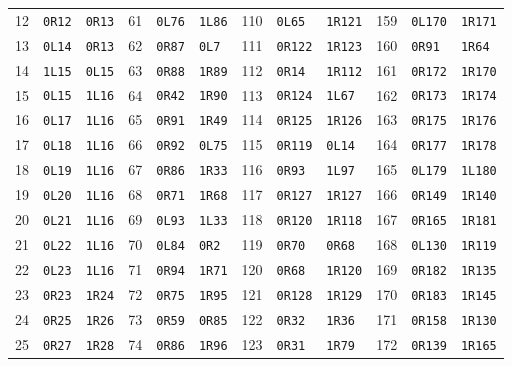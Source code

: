\begin{center}
\begin{tabular}{@{}rll@{\qquad}rll@{\qquad}rll@{\qquad}rll@{}}
12 & \texttt{0R12} & \texttt{0R13} & 61 & \texttt{0L76} & \texttt{1L86} & 110 & \texttt{0L65} & \texttt{1R121} & 159 & \texttt{0L170} & \texttt{1R171}\\
13 & \texttt{0L14} & \texttt{0R13} & 62 & \texttt{0R87} & \texttt{0L7} & 111 & \texttt{0R122} & \texttt{1R123} & 160 & \texttt{0R91} & \texttt{1R64}\\
14 & \texttt{1L15} & \texttt{0L15} & 63 & \texttt{0R88} & \texttt{1R89} & 112 & \texttt{0R14} & \texttt{1R112} & 161 & \texttt{0R172} & \texttt{1R170}\\
15 & \texttt{0L15} & \texttt{1L16} & 64 & \texttt{0R42} & \texttt{1R90} & 113 & \texttt{0R124} & \texttt{1L67} & 162 & \texttt{0R173} & \texttt{1R174}\\
16 & \texttt{0L17} & \texttt{1L16} & 65 & \texttt{0R91} & \texttt{1R49} & 114 & \texttt{0R125} & \texttt{1R126} & 163 & \texttt{0R175} & \texttt{1R176}\\
17 & \texttt{0L18} & \texttt{1L16} & 66 & \texttt{0R92} & \texttt{0L75} & 115 & \texttt{0R119} & \texttt{0L14} & 164 & \texttt{0R177} & \texttt{1R178}\\
18 & \texttt{0L19} & \texttt{1L16} & 67 & \texttt{0R86} & \texttt{1R33} & 116 & \texttt{0R93} & \texttt{1L97} & 165 & \texttt{0L179} & \texttt{1L180}\\
19 & \texttt{0L20} & \texttt{1L16} & 68 & \texttt{0R71} & \texttt{1R68} & 117 & \texttt{0R127} & \texttt{1R127} & 166 & \texttt{0R149} & \texttt{1R140}\\
20 & \texttt{0L21} & \texttt{1L16} & 69 & \texttt{0L93} & \texttt{1L33} & 118 & \texttt{0R120} & \texttt{1R118} & 167 & \texttt{0R165} & \texttt{1R181}\\
21 & \texttt{0L22} & \texttt{1L16} & 70 & \texttt{0L84} & \texttt{0R2} & 119 & \texttt{0R70} & \texttt{0R68} & 168 & \texttt{0L130} & \texttt{1R119}\\
22 & \texttt{0L23} & \texttt{1L16} & 71 & \texttt{0R94} & \texttt{1R71} & 120 & \texttt{0R68} & \texttt{1R120} & 169 & \texttt{0R182} & \texttt{1R135}\\
23 & \texttt{0R23} & \texttt{1R24} & 72 & \texttt{0R75} & \texttt{1R95} & 121 & \texttt{0R128} & \texttt{1R129} & 170 & \texttt{0R183} & \texttt{1R145}\\
24 & \texttt{0R25} & \texttt{1R26} & 73 & \texttt{0R59} & \texttt{0R85} & 122 & \texttt{0R32} & \texttt{1R36} & 171 & \texttt{0R158} & \texttt{1R130}\\
25 & \texttt{0R27} & \texttt{1R28} & 74 & \texttt{0R86} & \texttt{1R96} & 123 & \texttt{0R31} & \texttt{1R79} & 172 & \texttt{0R139} & \texttt{1R165}\\

\end{tabular}
\end{center}
